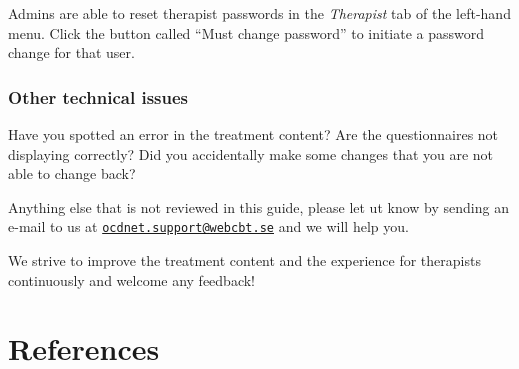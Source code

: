 \documentclass[]{book}
\theoremstyle{definition}
\theoremstyle{definition}
\theoremstyle{definition}
\theoremstyle{remark}
\begin{document}
Admins are able to reset therapist passwords in the \emph{Therapist} tab
of the left-hand menu. Click the button called ``Must change password''
to initiate a password change for that user.

\hypertarget{other-technical-issues}{%
\subsection{Other technical issues}\label{other-technical-issues}}

Have you spotted an error in the treatment content? Are the
questionnaires not displaying correctly? Did you accidentally make some
changes that you are not able to change back?

Anything else that is not reviewed in this guide, please let ut know by
sending an e-mail to us at
\href{mailto:ocdnet.support@webcbt.se}{\nolinkurl{ocdnet.support@webcbt.se}}
and we will help you.

We strive to improve the treatment content and the experience for
therapists continuously and welcome any feedback!

\hypertarget{references}{%
\chapter{References}\label{references}}


\end{document}
